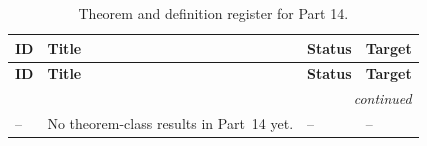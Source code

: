 \begingroup\scriptsize\setlength{\tabcolsep}{3pt}
\begin{longtable}{@{}p{}p{}p{}p{}@{}}
\caption{Theorem and definition register for Part 14.}\label{tab:p14-theorem-definition-register}\\
\toprule
\textbf{ID} & \textbf{Title} & \textbf{Status} & \textbf{Target} \\
\midrule
\endfirsthead
\toprule
\textbf{ID} & \textbf{Title} & \textbf{Status} & \textbf{Target} \\
\midrule
\endhead
\midrule\multicolumn{4}{r}{\emph{continued}}\\\endfoot
\bottomrule\endlastfoot
-- & No theorem-class results in Part~14 yet. & -- & -- \\
\end{longtable}
\endgroup
